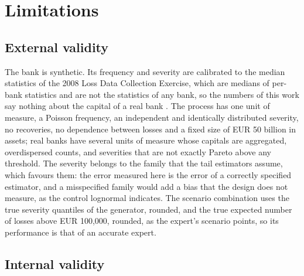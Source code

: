 \section{Limitations}
\label{sec:limitations}

\subsection{External validity}
\label{sec:lim-external}

The bank is synthetic. Its frequency and severity are calibrated to the median statistics of the 2008 Loss Data Collection Exercise, which are medians of per-bank statistics and are not the statistics of any bank, so the numbers of this work say nothing about the capital of a real bank \citep{bcbs160}. The process has one unit of measure, a Poisson frequency, an independent and identically distributed severity, no recoveries, no dependence between losses and a fixed size of EUR 50 billion in assets;
real banks have several units of measure whose capitals are aggregated, overdispersed counts, and severities that are not exactly Pareto above any threshold. The severity belongs to the family that the tail estimators assume, which favours them: the error measured here is the error of a correctly specified estimator, and a misspecified family would add a bias that the design does not measure, as the control lognormal indicates.
The scenario combination uses the true severity quantiles of the generator, rounded, and the true expected number of losses above EUR 100{,}000, rounded, as the expert's scenario points, so its performance is that of an accurate expert.

\subsection{Internal validity}
\label{sec:lim-internal}

